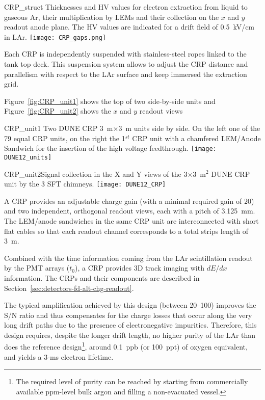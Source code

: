 \begin{cdrfigure}{CRP_struct}
{Thicknesses and HV values for electron extraction from liquid to gaseous Ar, their 
multiplication by LEMs and their collection on the $x$ and $y$ readout anode plane. The 
HV values are indicated for a drift field of 0.5~kV/cm in LAr.}
\texttt{[image: CRP\_gaps.png]}
\end{cdrfigure}

Each CRP  is independently suspended with stainless-steel ropes linked to the tank top deck. This suspension
system allows to adjust the CRP distance and parallelism with respect to the LAr surface and keep immersed the
extraction grid.

Figure~\ref{fig:CRP_unit1} shows the top of two side-by-side units and Figure~\ref{fig:CRP_unit2} shows the
$x$ and $y$ readout views

\begin{cdrfigure}{CRP_unit1} {Two DUNE CRP 3~m$\times$3~m units side by side. On the left one of the 79 equal 
CRP units, on the right the 1$^{st}$ CRP unit with a chamfered LEM/Anode Sandwich  for the insertion of the high voltage feedthrough.}
\texttt{[image: DUNE12\_units]}
\end{cdrfigure}
\begin{cdrfigure}
{CRP_unit2}{Signal collection in the X and Y views of the  3$\times$3~m$^2$ DUNE CRP unit by the 3 SFT chimneys.}
\texttt{[image: DUNE12\_CRP]}
\end{cdrfigure}

A CRP provides an adjustable charge gain (with a minimal required gain of 20) and two
independent, orthogonal readout views, each with a pitch of 3.125~mm.  The LEM/anode sandwiches 
in the same CRP unit are interconnected with short flat cables so that each readout
channel corresponds to a total strips length of 3~m.

Combined with the time information coming from the LAr scintillation readout by
the PMT arrays ($t_0$), a CRP provides 3D track imaging with $dE/dx$ information. 
The CRPs and their components are described in Section~\ref{sec:detectors-fd-alt-chg-readout}.

The typical amplification achieved by this design (between 20--100) improves the S/N ratio and thus compensates for the
charge losses that occur along the very long drift paths due to the presence of electronegative
impurities. Therefore, this design requires, despite the longer drift length, no higher purity of the LAr than does the reference 
design\footnote{The required level of purity can be reached by starting from commercially
available ppm-level bulk argon and filling a non-evacuated
vessel\cite{WA105_TDR}. }, 
around 0.1~ppb (or 100~ppt) of oxygen equivalent,
and yields a 3-ms electron lifetime.

